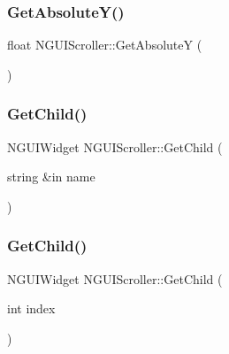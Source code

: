 \hypertarget{class_n_g_u_i_scroller_aa52e0b0151609edb4373738e14a8b472}{}\label{class_n_g_u_i_scroller_aa52e0b0151609edb4373738e14a8b472} 
\subsubsection{\texorpdfstring{Get\+Absolute\+Y()}{GetAbsoluteY()}}
{\footnotesize\ttfamily float N\+G\+U\+I\+Scroller\+::\+Get\+AbsoluteY (\begin{DoxyParamCaption}{ }\end{DoxyParamCaption})}

\hypertarget{class_n_g_u_i_scroller_addf4b4986c391985cb136ba7e62c735d}{}\label{class_n_g_u_i_scroller_addf4b4986c391985cb136ba7e62c735d} 
\subsubsection{\texorpdfstring{Get\+Child()}{GetChild()}\hspace{0.1cm}{\footnotesize\ttfamily [1/2]}}
{\footnotesize\ttfamily N\+G\+U\+I\+Widget N\+G\+U\+I\+Scroller\+::\+Get\+Child (\begin{DoxyParamCaption}\item[{string \&in}]{name }\end{DoxyParamCaption})}

\hypertarget{class_n_g_u_i_scroller_a84ebefffcfce7cb03ed21da1b810f76e}{}\label{class_n_g_u_i_scroller_a84ebefffcfce7cb03ed21da1b810f76e} 
\subsubsection{\texorpdfstring{Get\+Child()}{GetChild()}\hspace{0.1cm}{\footnotesize\ttfamily [2/2]}}
{\footnotesize\ttfamily N\+G\+U\+I\+Widget N\+G\+U\+I\+Scroller\+::\+Get\+Child (\begin{DoxyParamCaption}\item[{int}]{index }\end{DoxyParamCaption})}

\hypertarget{class_n_g_u_i_scroller_aed38bc77c34224b61197ac33621f3f2d}{}\label{class_n_g_u_i_scroller_aed38bc77c34224b61197ac33621f3f2d} 
